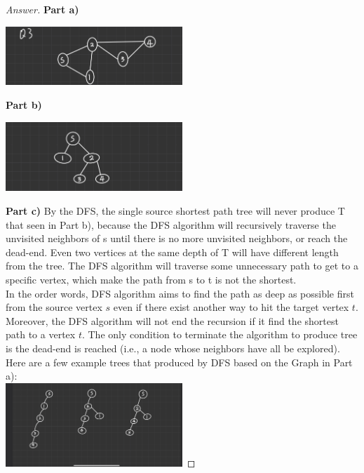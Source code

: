 \documentclass[11pt]{article}
\theoremstyle{definition}
\theoremstyle{definition}
\theoremstyle{definition}
\begin{document}
\noindent 
\begin{proof}[Answer]
\noindent \textbf{Part a)}
\begin{center}
\includegraphics[width=0.5\textwidth]{Q3A.PNG}
\end{center}

\noindent \textbf{Part b)}
\begin{center}
\includegraphics[width=0.5\textwidth]{Q3B.PNG}
\end{center}
\noindent \textbf{Part c)}
By the DFS, the single source shortest path tree will never produce T that seen in Part b), because the DFS algorithm will recursively traverse the unvisited neighbors of s  until there is no more unvisited neighbors, or reach the dead-end. Even two vertices at the same depth of T will have different length from the tree. The DFS algorithm will traverse some unnecessary path to get to a specific vertex, which make the path from s to t is not the shortest.\\
In the order words, DFS algorithm aims to find the path as deep as possible first from the source vertex $s$ even if there exist another way to hit the target vertex $t$. Moreover, the DFS algorithm will not end the recursion if it find the shortest path to a vertex $t$. The only condition to terminate the algorithm to produce tree is the dead-end is reached (i.e., a node whose neighbors have all be explored). \\
Here are a few example trees that produced by DFS based on the Graph in Part a):\\
\includegraphics[width=0.5\textwidth]{Q3C.PNG}
\end{proof}
\end{document}
